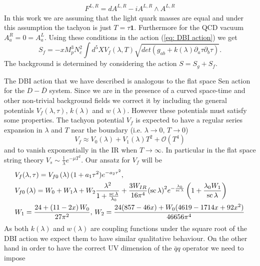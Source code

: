\documentclass[a4paper,12pt]{article}
\begin{document}
\begin{align}
F^{L,R} = d A^{L,R} - i A^{L,R} \wedge A^{L,R}
\end{align}
In this work we are assuming that the light quark masses are equal and under this assumption the tachyon is just $T = \tau \mathbf{1}$. Furthermore for the QCD vacuum $A^R_a = 0 = A^L_a$. Using these conditions in the action (\ref{eq: DBI action}) we get
\begin{equation}
S_f = - x M_p^3 N_c^2 \int d^5 X V_f\left(\lambda, T\right) \sqrt{det\left(g_{ab} + k\left(\lambda\right) \partial_a \tau \partial_b \tau \right)}.
\label{eq:sf_equation}
\end{equation}
The background is determined by considering the action $S = S_g + S_f$.

The DBI action that we have described is analogous to the flat space Sen action for the $D - \bar{D}$ system. Since we are in the presence of a curved space-time  and other non-trivial background fields we correct it by including the general potentials $V_f(\lambda, \tau)$, $k(\lambda)$ and $w(\lambda)$. However these potentials must satisfy some properties. The tachyon potential $V_f$ is expected to have a regular series expansion in $\lambda$ and $T$ near the boundary (i.e. $\lambda \rightarrow 0, \, T \rightarrow 0$)
\begin{equation}
V_f \approx V_0 (\lambda) + V_1 (\lambda) T^2 + \mathcal{O}(T^4)
\end{equation} 
and to vanish exponentially in the IR when $T \rightarrow \infty$. In particular in the flat space string theory $V_s \sim \frac{1}{\lambda} e^{- \mu T^2}$. Our ansatz for $V_f$ will be
\begin{align}
& V_f(\lambda, \tau) = V_{f0} \left(\lambda\right) ( 1 + a_1 \tau^2) e^{- a_2 \tau^2}, \\ \notag
& V_{f0}\left(\lambda\right) = W_0 + W_1 \lambda + W_2 \frac{\lambda^2}{1+ \frac{\rm{sc} \, \lambda}{\lambda_0}} + \frac{3 W_{IR}}{16 \pi^4} {\left(\rm{sc} \, \lambda \right)}^2 e^{- \frac{\lambda_0}{\rm{sc} \, \lambda}} \left( 1 + \frac{\lambda_0 W_1}{\rm{sc} \, \lambda}\right) \\
& W_1 = \frac{24 + \left(11- 2 x\right) W_0}{27 \pi^2}, \, W_2 =  \frac{24 (857 - 46 x) + W_0 (4619 - 1714 x + 92 x^2)}{46656 \pi^4} 
\end{align}
As both $k(\lambda)$ and $w(\lambda)$ are coupling functions under the square root of the DBI action we expect them to have similar qualitative behaviour. On the other hand in order to have the correct UV dimension of the $\bar{q}q$ operator we need to impose
\end{document}
